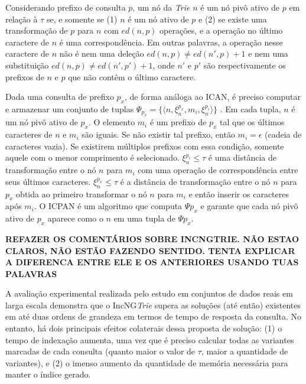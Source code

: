 Considerando prefixo de consulta $p$, um nó da \textit{Trie} $n$ é um nó pivô ativo de $p$ em relação à $\tau$ se, e somente se (1) $n$ é um nó ativo de $p$ e (2) se existe uma transformação de $p$ para $n$ com $ed(n,p)$ operações, e a operação no último caractere de $n$ é uma correspondência. Em outras palavras, a operação nesse caractere de $n$ não é nem uma deleção $ed(n,p) \neq ed(n',p) + 1$ e nem uma substituição $ed(n,p) \neq ed(n', p') + 1$, onde $n'$ e $p'$ são respectivamente os prefixos de $n$ e $p$ que não contêm o último caractere.

Dada uma consulta de prefixo $p_{x}$, de forma análoga ao ICAN, é preciso computar e armazenar um conjunto de tuplas $\Psi_{p_{x}} = \{ \langle n, \xi_{n}^{p_{x}}, m_{i}, \xi_{n}^{p_{i}} \rangle \}$ \citep{li2011efficient}. Em cada tupla, $n$ é um nó pivô ativo de $p_{x}$. O elemento $m_{i}$ é um prefixo de $p_{x}$ tal que os últimos caracteres de $n$ e $m_{i}$ são iguais. Se não existir tal prefixo, então $m_{i} = \epsilon$ (cadeia de caracteres vazia). Se existirem múltiplos prefixos com essa condição, somente aquele com o menor comprimento é selecionado. $\xi_{n}^{p_{i}} \leq \tau$ é uma distância de transformação entre o nó $n$ para $m_{i}$ com uma operação de correspondência entre seus últimos caracteres. $\xi_{n}^{p_{x}} \leq \tau$ é a distância de transformação entre o nó $n$ para $p_{x}$ obtida ao primeiro transformar o nó $n$ para $m_{i}$ e então inserir os caracteres após $m_{i}$. O ICPAN é um algoritmo que computa $\Psi{p_{x}}$ e garante que cada nó pivô ativo de $p_{x}$ aparece como o $n$ em uma tupla de $\Psi{p_{x}}$.

\textbf{ REFAZER OS COMENTÁRIOS SOBRE INCNGTRIE. NÃO ESTAO CLAROS, NÃO ESTÃO FAZENDO SENTIDO. TENTA EXPLICAR A DIFERENCA ENTRE ELE E OS ANTERIORES USANDO TUAS PALAVRAS}


A avaliação experimental realizada pelo estudo em conjuntos de dados reais em larga escala demonstra que o IncNG\textit{Trie} supera as soluções (até então) existentes em até duas ordens de grandeza em termos de tempo de resposta da consulta. No entanto, há dois principais efeitos colaterais dessa proposta de solução: (1) o tempo de indexação aumenta, uma vez que é preciso calcular todas as variantes marcadas de cada consulta (quanto maior o valor de $\tau$, maior a quantidade de variantes), e (2) o imenso aumento da quantidade de memória necessária para manter o índice gerado. 

